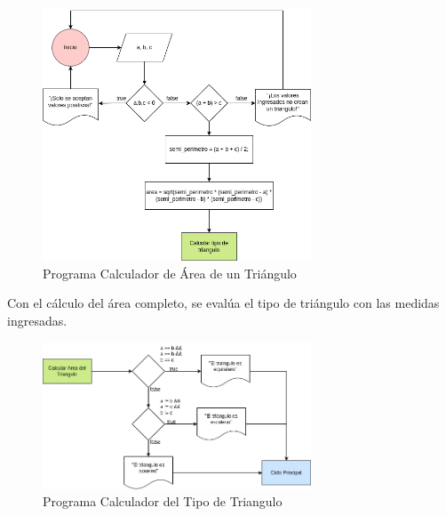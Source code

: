 \documentclass{article}
\begin{document}
\begin{figure}[h]
    \centering
    \includegraphics[width=8cm]{triangulo_area}
    \caption{Programa Calculador de Área de un Triángulo}
\end{figure}

Con el cálculo del área completo, se evalúa el tipo de triángulo con las medidas ingresadas.

\begin{figure}[h]
    \centering
    \includegraphics[width=8cm]{triangulo_tipo}
    \caption{Programa Calculador del Tipo de Triangulo}
\end{figure}
\end{document}
